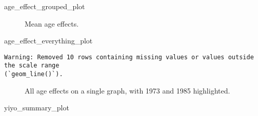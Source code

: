 \documentclass[
  10pt,
  letterpaper,
  DIV=11,
  numbers=noendperiod,
  twoside]{scrartcl}
\newenvironment{Shaded}{\begin{snugshade}}{\end{snugshade}}
\newcommand{\NormalTok}[1]{\textcolor[rgb]{0.00,0.23,0.31}{#1}}
\begin{document}
\begin{figure*}[H]


\caption{\label{fig-ageeffecttibble}}

\end{figure*}%

\begin{Shaded}
\begin{Highlighting}[]
\NormalTok{age\_effect\_grouped\_plot}
\end{Highlighting}
\end{Shaded}

\begin{figure}[H]


\caption{\label{fig-ageeffectgrouped}Mean age effects.}

\end{figure}%

\begin{Shaded}
\begin{Highlighting}[]
\NormalTok{age\_effect\_everything\_plot}
\end{Highlighting}
\end{Shaded}

\begin{verbatim}
Warning: Removed 10 rows containing missing values or values outside the scale range
(`geom_line()`).
\end{verbatim}

\begin{figure}[H]


\caption{\label{fig-ageeffecteverything}All age effects on a single
graph, with 1973 and 1985 highlighted.}

\end{figure}%

\begin{Shaded}
\begin{Highlighting}[]
\NormalTok{yiyo\_summary\_plot}
\end{Highlighting}
\end{Shaded}
\end{document}
